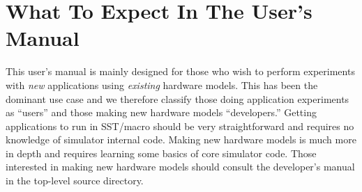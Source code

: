 \section{What To Expect In The User's Manual}
\label{sec:whatToExpect}

This user's manual is mainly designed for those who wish to perform experiments with \emph{new} applications using \emph{existing} hardware models.
This has been the dominant use case and we therefore classify those doing application experiments as ``users'' and those making new hardware models ``developers.''
Getting applications to run in SST/macro should be very straightforward and requires no knowledge of simulator internal code.
Making new hardware models is much more in depth and requires learning some basics of core simulator code.
Those interested in making new hardware models should consult the developer's manual in the top-level source directory.
